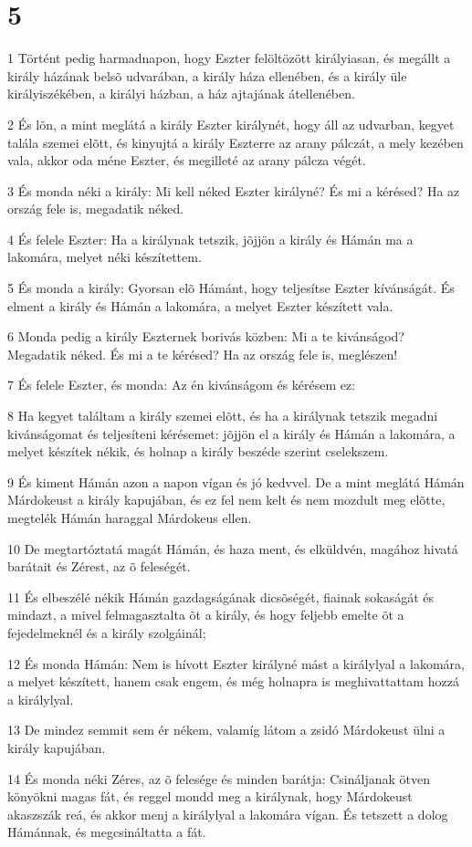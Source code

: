 \chapter{5}

\par 1 Történt pedig harmadnapon, hogy Eszter felöltözött királyiasan, és megállt a király házának belsõ udvarában, a király háza ellenében, és a király üle királyiszékében, a királyi házban, a ház ajtajának átellenében.
\par 2 És lõn, a mint meglátá a király Eszter királynét, hogy áll az udvarban, kegyet talála szemei elõtt, és kinyujtá a király Eszterre az arany pálczát, a mely kezében vala, akkor oda méne Eszter, és megilleté az arany pálcza végét.
\par 3 És monda néki a király: Mi kell néked Eszter királyné? És mi a kérésed? Ha az ország fele is, megadatik néked.
\par 4 És felele Eszter: Ha a királynak tetszik, jõjjön a király és Hámán ma a lakomára, melyet néki készítettem.
\par 5 És monda a király: Gyorsan elõ Hámánt, hogy teljesítse Eszter kívánságát. És elment a király és Hámán a lakomára, a melyet Eszter készített vala.
\par 6 Monda pedig a király Eszternek borivás közben: Mi a te kivánságod? Megadatik néked. És mi a te kérésed? Ha az ország fele is, meglészen!
\par 7 És felele Eszter, és monda: Az én kivánságom és kérésem ez:
\par 8 Ha kegyet találtam a király szemei elõtt, és ha a királynak tetszik megadni kivánságomat és teljesíteni kérésemet: jõjjön el a király és Hámán a lakomára, a melyet készítek nékik, és holnap a király beszéde szerint cselekszem.
\par 9 És kiment Hámán azon a napon vígan és jó kedvvel. De a mint meglátá Hámán Márdokeust a király kapujában, és ez fel nem kelt és nem mozdult meg elõtte, megtelék Hámán haraggal Márdokeus ellen.
\par 10 De megtartóztatá magát Hámán, és haza ment, és elküldvén, magához hivatá barátait és Zérest, az õ feleségét.
\par 11 És elbeszélé nékik Hámán gazdagságának dicsõségét, fiainak sokaságát és mindazt, a mivel felmagasztalta õt a király, és hogy feljebb emelte õt a fejedelmeknél és a király szolgáinál;
\par 12 És monda Hámán: Nem is hívott Eszter királyné mást a királylyal a lakomára, a melyet készített, hanem csak engem, és még holnapra is meghivattattam hozzá a királylyal.
\par 13 De mindez semmit sem ér nékem, valamíg látom a zsidó Márdokeust ülni a király kapujában.
\par 14 És monda néki Zéres, az õ felesége és minden barátja: Csináljanak ötven könyökni magas fát, és reggel mondd meg a királynak, hogy Márdokeust akaszszák reá, és akkor menj a királylyal a lakomára vígan. És tetszett a dolog Hámánnak, és megcsináltatta a fát.

